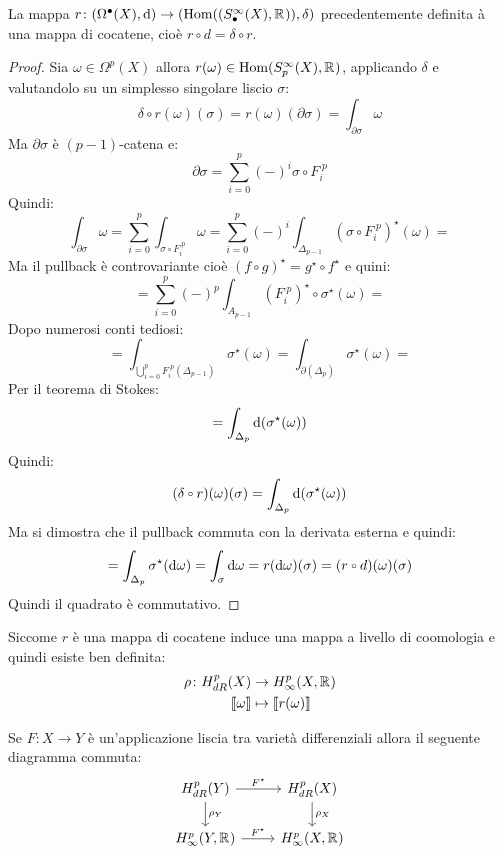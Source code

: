 \begin{lemma}
  La mappa
  $ r \colon (\Omega^\bullet(X), \operatorname{d}\!{}) \to (\mathrm{Hom}( (S^\infty_\bullet(X), \mathbb{R}^{})), \delta) $ precedentemente definita
  à una mappa di cocatene, cioè $ r \circ d = \delta \circ r $.
\end{lemma}
\begin{proof}
  Sia $ \omega \in \Omega^p(X) $ allora $ r(\omega) \in \mathrm{Hom}( S^\infty_p(X), \mathbb{R}^{}) $, applicando $ \delta $
  e valutandolo su un simplesso singolare liscio $ \sigma $:
  \[
    \delta \circ r(\omega)(\sigma) = r(\omega)(\partial \sigma) = \int_{\partial \sigma} \omega
  \]
  Ma $ \partial \sigma $ è $ (p-1) $-catena e:
  \[
    \partial \sigma = \sum_{i=0}^p(-)^i\sigma \circ F_i^{\; p}
  \]
  Quindi:
  \[
    \int_{\partial \sigma} \omega = \sum_{i=0}^p \int_{\sigma \circ F_i^{\; p}} \omega = \sum_{i=0}^p(-)^i \int_{\Delta_{p-1}} (\sigma \circ F_i^{\; p})^\star (\omega) =
  \]
  Ma il pullback è controvariante cioè $ (f \circ g)^\star = g^\star \circ f^\star $ e quini:
  \[
    =\sum_{i=0}^p (-)^p \int_{A_{p-1}} (F_i^{\; p})^\star \circ \sigma^\star (\omega) =
  \]
  Dopo numerosi conti tediosi:
  \[
    = \int_{\bigcup_{i=0}^p F_i^{\; p}(\Delta_{p-1})} \sigma^\star(\omega) = \int_{\partial(\Delta_p)} \sigma^\star(\omega) =
  \]
  Per il teorema di Stokes:
  \[
    = \int_{\Delta_p} \operatorname{d}\!{(\sigma^\star(\omega))}
  \]
  Quindi:
  \[
    (\delta \circ r)(\omega)(\sigma) = \int_{\Delta_p} \d{(\sigma^\star(\omega))}
  \]
  Ma si dimostra che il pullback commuta con la derivata esterna e quindi:
  \[
    = \int_{\Delta_p} \sigma^\star(\d \omega) = \int_\sigma \d \omega = r (\d \omega) (\sigma) = (r \circ d)(\omega)(\sigma)
  \]
  Quindi il quadrato è commutativo.
\end{proof}
Siccome $ r $ è una mappa di cocatene induce una mappa a livello di coomologia
e quindi esiste ben definita:
\begin{align*}
  \rho \colon H^p_{dR}(X) & \to H^p_\infty (X, \mathbb{R}^{}) \\
  \llbracket \omega \rrbracket & \mapsto \llbracket r(\omega) \rrbracket
\end{align*}
\begin{lemma}
  Se $ F \colon X \to Y $ è un'applicazione liscia tra varietà differenziali allora
  il seguente diagramma commuta:
  \[
    \begin{tikzcd}
      H^p_{dR}(Y) \rar{F^\star} \dar{\rho_Y} & H^p_{dR}(X) \dar{\rho_X} \\
      H^p_\infty(Y, \RN{}) \rar{F^\star} & H^p_\infty(X, \RN{})
    \end{tikzcd}
  \]
\end{lemma}
